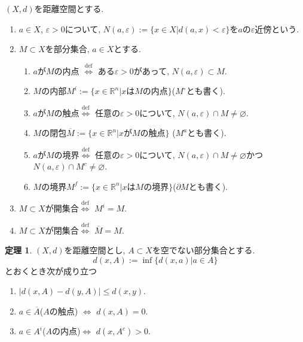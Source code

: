 \documentclass[dvipdfmx,a4paper,11pt]{article}
\newcommand{\R}{\mathbb{R}}
\theoremstyle{definition}
\newtheorem{thm}{定理}
\begin{document}
 \begin{tcolorbox}[
    colback = white,
    colframe = black!35!black,
    fonttitle = \bfseries,
    breakable = true]
$(X,d)$を距離空間とする. 
    \begin{enumerate}
    \setlength{\parskip}{0cm} 
  \setlength{\itemsep}{0cm} 
\item $a \in X$, $\varepsilon >0$について, $N(a, \varepsilon):= \{ x \in X | d(a, x) < \varepsilon\}$を$a$の$\varepsilon$近傍という.
\item $M \subset X$を部分集合, $a \in X$とする.
    \begin{enumerate}[label=(\arabic*).]
    \setlength{\parskip}{0cm} 
  \setlength{\itemsep}{0cm} 
  \item $a$が$M$の内点 $\stackrel{\mathrm{def}}{\Longleftrightarrow}$ ある$\varepsilon >0$があって, $N(a, \varepsilon)\subset M$.
  \item $M$の内部$M^i := \{ x \in \R^n| \text{$x$は$M$の内点}\}$($M^{\circ}$とも書く).
  \item $a$が$M$の触点$\stackrel{\mathrm{def}}{\Longleftrightarrow}$ 任意の$\varepsilon >0$について, $N(a, \varepsilon) \cap M \neq \varnothing$.
    \item $M$の閉包$\overline{M} := \{ x \in \R^n| \text{$x$が$M$の触点}\}$ ($M^a$とも書く).
   \item $a$が$M$の境界$\stackrel{\mathrm{def}}{\Longleftrightarrow}$ 任意の$\varepsilon >0$について, $N(a, \varepsilon) \cap M \neq \varnothing$かつ$N(a, \varepsilon) \cap M^c \neq \varnothing$.
    \item $M$の境界$M^f := \{ x \in \R^n| \text{$x$は$M$の境界}\}$($\partial M$とも書く).
  \end{enumerate}
  \item $M \subset X$が開集合$\stackrel{\mathrm{def}}{\Longleftrightarrow}$ $M^i =M$.
  \item $M \subset X$が閉集合$\stackrel{\mathrm{def}}{\Longleftrightarrow}$ $\overline{M} =M$.
   \end{enumerate}
 \end{tcolorbox}
 
 
\begin{tcolorbox}[
    colback = white,
    colframe = black!35!black,
    fonttitle = \bfseries,
    breakable = true]
    \begin{thm}
    $(X, d)$を距離空間とし, $A \subset X$を空でない部分集合とする.
    $$
    d(x, A):= \inf \{ d(x, a) | a \in A\}  
    $$
    とおくとき次が成り立つ
    \begin{enumerate}[label=(\arabic*).]
    \setlength{\parskip}{0cm} 
  \setlength{\itemsep}{0cm} 
  \item $|d(x, A) - d(y, A)| \le d(x, y)$.
  \item $a \in \overline{A}$($A$の触点) $\Longleftrightarrow$ $d(x, A)=0$. 
    \item $a \in A^i$($A$の内点)$\Longleftrightarrow$ $d(x, A^c)>0$. 
\end{enumerate}
\end{thm}
 \end{tcolorbox}
 
\end{document}
